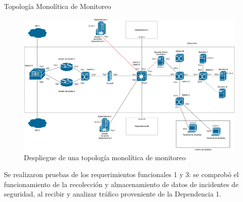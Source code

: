 \begin{subsection}{Topología Monolítica de Monitoreo}
    \begin{figure}[H]
    \centering
    \includegraphics[width=1\textwidth]{./iteracion_1_imagenes/figura_topologia_m_unc.png}
    \caption{Despliegue de una topología monolítica de monitoreo}
    \label{fig:iter1_top_m_unc}
    \end{figure}
    \FloatBarrier
    Se realizaron pruebas de los requerimientos funcionales 1 y 3: se comprobó el funcionamiento de la recolección y almacenamiento de datos de incidentes de seguridad, al recibir y analizar tráfico proveniente de la Dependencia 1. \par
    
    \end{subsection}
    
